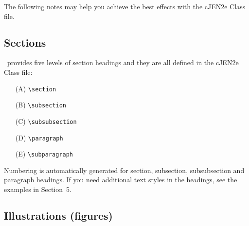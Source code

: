 \documentclass[]{cJEN2e}
\begin{document}
The following notes may help you achieve the best effects with the cJEN2e Class file.

\subsection{Sections}

\LaTeXe\ provides five levels of section headings and they are all defined in the cJEN2e Class file:
\begin{enumerate}
   \item[(A)] \verb"\section"
   \item[(B)] \verb"\subsection"
   \item[(C)] \verb"\subsubsection"
   \item[(D)] \verb"\paragraph"
   \item[(E)] \verb"\subparagraph"
\end{enumerate}
Numbering is automatically generated for section, subsection, subsubsection and paragraph headings.  If you need
additional text styles in the headings, see the examples in Section~5.

\subsection{Illustrations (figures)}
\end{document}
